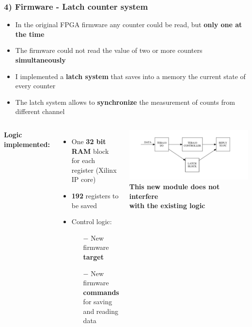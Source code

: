 \documentclass[aspectratio=169]{beamer}
\begin{document}
	\begin{frame}
		\frametitle{4) Firmware - Latch counter system}
		\begin{itemize}
			\item In the original FPGA firmware any counter could be read, but \textbf{only one at the time}
			\item The firmware could not read the value of two or more counters \textbf{simultaneously}
			\item I implemented a \textbf{latch system} that saves into a memory the current state of every counter
			\item The latch system allows to \textbf{synchronize} the measurement of counts from different channel
		\end{itemize}
		\begin{columns}
			{\color{blue} \textbf{Logic implemented:}}
			\begin{itemize}
				\item One \textbf{32 bit RAM} block\\ for each register (Xilinx IP core)
				\item \textbf{192} registers to be saved
				\item Control logic:
				\begin{itemize}
					\item[$-$] New firmware \textbf{target}
					\item[$-$] New firmware \textbf{commands} for saving and reading data
				\end{itemize}
			\end{itemize}
			\begin{center}
				\includegraphics[width=1.0 \textwidth]{IMG2/latch_counter}\\
				\textbf{This new module does not interfere\\with the existing logic}
			\end{center}
		\end{columns}
	\end{frame}
\end{document}
